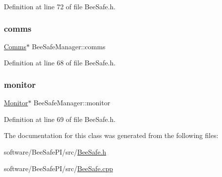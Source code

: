 Definition at line 72 of file Bee\+Safe.\+h.

\mbox{\label{class_bee_safe_manager_a80b19afbb679d08be14d67a45447f9e1}} 
\subsubsection{\texorpdfstring{comms}{comms}}
{\footnotesize\ttfamily \hyperlink{class_comms}{Comms}$\ast$ Bee\+Safe\+Manager\+::comms\hspace{0.3cm}{\ttfamily [private]}}



Definition at line 68 of file Bee\+Safe.\+h.

\mbox{\label{class_bee_safe_manager_a3b885b4fb364228c914095f2e670f9af}} 
\subsubsection{\texorpdfstring{monitor}{monitor}}
{\footnotesize\ttfamily \hyperlink{class_monitor}{Monitor}$\ast$ Bee\+Safe\+Manager\+::monitor\hspace{0.3cm}{\ttfamily [private]}}



Definition at line 69 of file Bee\+Safe.\+h.



The documentation for this class was generated from the following files\+:\begin{DoxyCompactItemize}
\item 
software/\+Bee\+Safe\+P\+I/src/\hyperlink{_bee_safe_8h}{Bee\+Safe.\+h}\item 
software/\+Bee\+Safe\+P\+I/src/\hyperlink{_bee_safe_8cpp}{Bee\+Safe.\+cpp}\end{DoxyCompactItemize}
